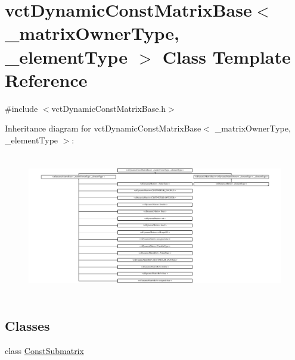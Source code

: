 \hypertarget{classvct_dynamic_const_matrix_base}{}\section{vct\+Dynamic\+Const\+Matrix\+Base$<$ \+\_\+matrix\+Owner\+Type, \+\_\+element\+Type $>$ Class Template Reference}
\label{classvct_dynamic_const_matrix_base}


{\ttfamily \#include $<$vct\+Dynamic\+Const\+Matrix\+Base.\+h$>$}

Inheritance diagram for vct\+Dynamic\+Const\+Matrix\+Base$<$ \+\_\+matrix\+Owner\+Type, \+\_\+element\+Type $>$\+:\begin{figure}[H]
\begin{center}
\leavevmode
\includegraphics[height=6.333999cm]{d5/d32/classvct_dynamic_const_matrix_base}
\end{center}
\end{figure}
\subsection*{Classes}
\begin{DoxyCompactItemize}
\item 
class \hyperlink{classvct_dynamic_const_matrix_base_1_1_const_submatrix}{Const\+Submatrix}
\end{DoxyCompactItemize}
